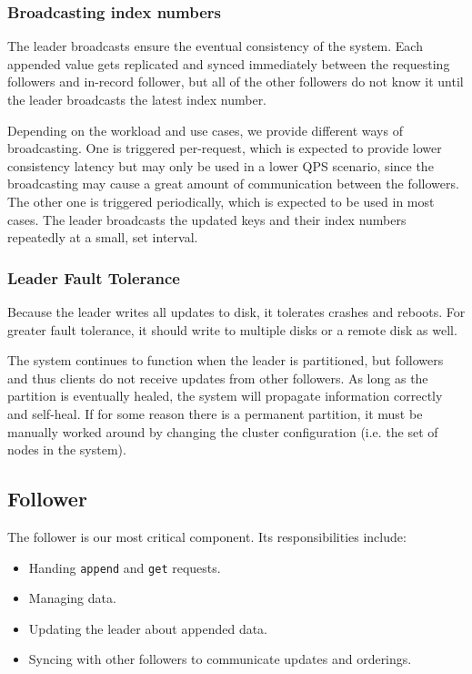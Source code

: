 \documentclass[11pt,english,twocolumn]{article}
\begin{document}
\subsubsection{Broadcasting index numbers}
The leader broadcasts ensure the eventual consistency of the system. Each
appended value gets replicated and synced immediately between the requesting
followers and in-record follower, but all of the other followers do not know
it until the leader broadcasts the latest index number. 

Depending on the workload and use cases, we provide different ways of
broadcasting. One is triggered per-request, which is expected to provide lower
consistency latency but may only be used in a lower QPS scenario, since the
broadcasting may cause a great amount of communication between the followers.
The other one is triggered periodically, which is expected to be used in most
cases. The leader broadcasts the updated keys and their index numbers repeatedly
at a small, set interval.

\subsubsection{Leader Fault Tolerance}
Because the leader writes all updates to disk, it tolerates crashes and reboots.
For greater fault tolerance, it should write to multiple disks or a remote disk
as well.

The system continues to function when the leader is partitioned, but followers
and thus clients do not receive updates from other followers. As long as the
partition is eventually healed, the system will propagate information correctly
and self-heal. If for some reason there is a permanent partition, it must be
manually worked around by changing the cluster configuration (i.e. the set of
nodes in the system).

\subsection{Follower}
The follower is our most critical component. Its responsibilities include:

\begin{itemize}
	\item Handing \texttt{append} and \texttt{get} requests. \vspace{-0.4cm}
	\item Managing data. \vspace{-0.4cm}
	\item Updating the leader about appended data. \vspace{-0.4cm}
	\item Syncing with other followers to communicate updates and orderings.
\end{itemize}
\end{document}
